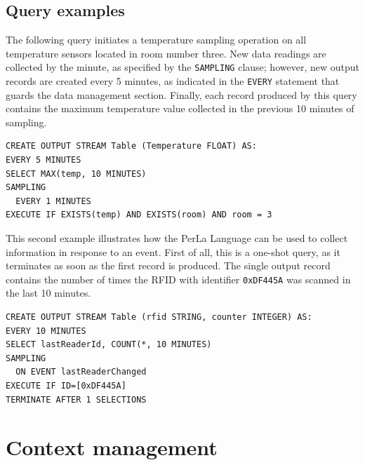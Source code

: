 \subsection{Query examples}

The following query initiates a temperature sampling operation on all
temperature sensors located in room number three. New data readings are
collected by the minute, as specified by the \texttt{SAMPLING} clause; however,
new output records are created every 5 minutes, as indicated in the
\texttt{EVERY} statement that guards the data management section. Finally, each
record produced by this query contains the maximum temperature value collected
in the previous 10 minutes of sampling.

\begin{lstlisting}
CREATE OUTPUT STREAM Table (Temperature FLOAT) AS:
EVERY 5 MINUTES
SELECT MAX(temp, 10 MINUTES)
SAMPLING
  EVERY 1 MINUTES
EXECUTE IF EXISTS(temp) AND EXISTS(room) AND room = 3
\end{lstlisting}


This second example illustrates how the PerLa Language can be used to collect
information in response to an event. First of all, this is a one-shot query, as
it terminates as soon as the first record is produced. The single output record
contains the number of times the RFID with identifier \texttt{0xDF445A} was
scanned in the last 10 minutes.

\begin{lstlisting}
CREATE OUTPUT STREAM Table (rfid STRING, counter INTEGER) AS:
EVERY 10 MINUTES
SELECT lastReaderId, COUNT(*, 10 MINUTES)
SAMPLING
  ON EVENT lastReaderChanged
EXECUTE IF ID=[0xDF445A]
TERMINATE AFTER 1 SELECTIONS
\end{lstlisting}


\section{Context management}

